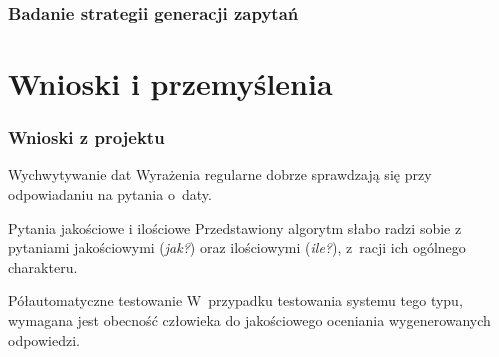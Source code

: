 \documentclass{beamer}
\begin{document}
\begin{frame}
  \frametitle{Badanie strategii generacji zapytań}
  \begin{figure}
    \label{fig:porownanie-strategie}
  \end{figure}
\end{frame}

\section{Wnioski i przemyślenia}
\begin{frame}
  \frametitle{Wnioski z projektu}
  \begin{block}{Wychwytywanie dat}
    Wyrażenia regularne dobrze sprawdzają się przy odpowiadaniu na pytania o~daty.
  \end{block}

  \begin{block}{Pytania jakościowe i ilościowe}
    Przedstawiony algorytm słabo radzi sobie z pytaniami jakościowymi (\textit{jak?}) oraz ilościowymi (\textit{ile?}), z~racji ich ogólnego charakteru.
  \end{block}

  \begin{block}{Półautomatyczne testowanie}
    W~przypadku testowania systemu tego typu, wymagana jest obecność człowieka do jakościowego oceniania wygenerowanych odpowiedzi.
  \end{block}
\end{frame}
\end{document}
